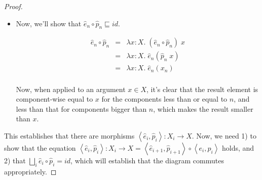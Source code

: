 \begin{proof}
\begin{itemize}
  \item Now, we'll show that $\hat{e}_n \circ \hat{p}_n \sqsubseteq id$. 
    
    \begin{displaymath}
      \begin{array}{lcl}
        \hat{e}_n \circ \hat{p}_n & = & \lambda x:X.\; (\hat{e}_n \circ \hat{p}_n) \; x \\
                                  & = & \lambda x:X.\; \hat{e}_n (\hat{p}_n \; x) \\ 
                                  & = & \lambda x:X.\; \hat{e}_n (x_n) \\ 
      \end{array}
    \end{displaymath}

    Now, when applied to an argument $x \in X$, it's clear that the
    result element is component-wise equal to $x$ for the components
    less than or equal to $n$, and less than that for components
    bigger than $n$, which makes the result smaller than $x$.
  \end{itemize}
This establishes that there are morphisms $\left<\hat{e}_i,
\hat{p}_i\right> : X_i \to X$. Now, we need 1) to show that the 
equation $\left<\hat{e}_i, \hat{p}_i\right> : X_i \to X = 
\left<\hat{e}_{i+1}, \hat{p}_{i+1}\right> \circ \left<e_i, p_i\right>$ 
holds, and 2) that $\bigsqcup_i \hat{e}_i \circ \hat{p}_i = id$, 
which will establish that the diagram commutes appropriately. 


\end{proof}
